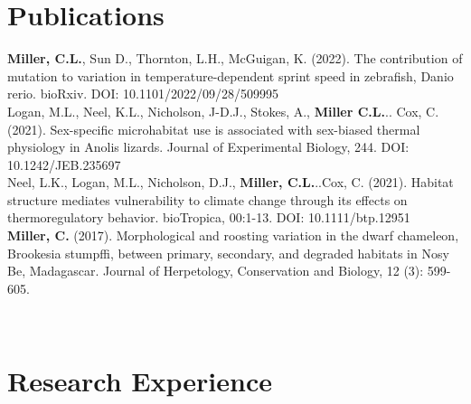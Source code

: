 \documentclass[a4paper,11pt,english]{article}
\begin{document}
\section*{Publications}
\begin{flushleft}
	\begin{itemize}
		\textbf {Miller, C.L.}, Sun D., Thornton, L.H., McGuigan, K. (2022). The contribution of mutation to variation in temperature-dependent sprint speed in zebrafish, Danio rerio. bioRxiv. DOI: 10.1101/2022/09/28/509995
		\>   \\    
		Logan, M.L., Neel, K.L., Nicholson, J-D.J., Stokes, A., \textbf{Miller C.L.}.. Cox, C. (2021). Sex-specific microhabitat use is associated with sex-biased thermal physiology in Anolis lizards. Journal of Experimental Biology, 244. DOI: 10.1242/JEB.235697
		\>   \\    
		Neel, L.K., Logan, M.L., Nicholson, D.J., \textbf{Miller, C.L.}..Cox, C. (2021). Habitat structure mediates vulnerability to climate change through its effects on thermoregulatory behavior. bioTropica, 00:1-13. DOI: 10.1111/btp.12951
		\>   \\    
		\textbf{Miller, C.} (2017). Morphological and roosting variation in the dwarf chameleon, Brookesia stumpffi, between primary, secondary, and degraded habitats in Nosy Be, Madagascar. Journal of Herpetology, Conservation and Biology, 12 (3): 599-605.
	\end{itemize}
	\>   \\    
		
\end{flushleft}


\section*{Research Experience}
\begin{flushleft}
	\>   \\ 
\end{flushleft}
\end{document}
